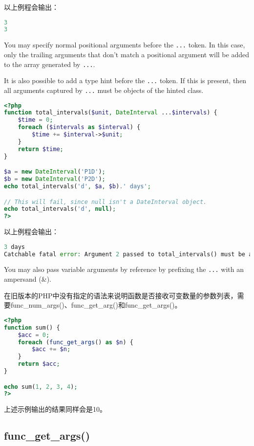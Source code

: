 以上例程会输出：


\begin{lstlisting}[language=PHP]
3
3
\end{lstlisting}

You may specify normal positional arguments before the \texttt{...} token. In this case, only the trailing arguments that don't match a positional argument will be added to the array generated by \texttt{...}.

It is also possible to add a type hint before the \texttt{...} token. If this is present, then all arguments captured by \texttt{...} must be objects of the hinted class.

\begin{lstlisting}[language=PHP]
<?php
function total_intervals($unit, DateInterval ...$intervals) {
    $time = 0;
    foreach ($intervals as $interval) {
        $time += $interval->$unit;
    }
    return $time;
}

$a = new DateInterval('P1D');
$b = new DateInterval('P2D');
echo total_intervals('d', $a, $b).' days';

// This will fail, since null isn't a DateInterval object.
echo total_intervals('d', null);
?>
\end{lstlisting}

以上例程会输出：

\begin{lstlisting}[language=PHP]
3 days
Catchable fatal error: Argument 2 passed to total_intervals() must be an instance of DateInterval, null given, called in - on line 14 and defined in - on line 2
\end{lstlisting}

You may also pass variable arguments by reference by prefixing the \texttt{...} with an ampersand (\&).

在旧版本的PHP中没有指定的语法来说明函数是否接收可变数量的参数列表，需要func\_num\_args()、func\_get\_arg()和func\_get\_args()。

\begin{lstlisting}[language=PHP]
<?php
function sum() {
    $acc = 0;
    foreach (func_get_args() as $n) {
        $acc += $n;
    }
    return $acc;
}

echo sum(1, 2, 3, 4);
?>
\end{lstlisting}

上述示例输出的结果同样会是10。

\subsection{func\_get\_args()}

